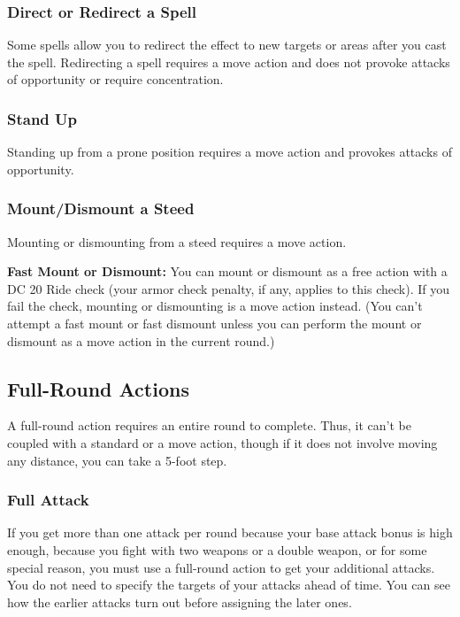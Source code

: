 \subsubsection{Direct or Redirect a Spell}

Some spells allow you to redirect the effect to new targets or areas after 
you cast the spell. Redirecting a spell requires a move action and does not provoke 
attacks of opportunity or require concentration.

\subsubsection{Stand Up}

Standing up from a prone position requires a move action and provokes attacks of 
opportunity.

\subsubsection{Mount/Dismount a Steed}

Mounting or dismounting from a steed requires a move action.

\textbf{Fast Mount or Dismount:} You can mount or dismount as a free action with 
a DC 20 Ride check (your armor check penalty, if any, applies to this check). If 
you fail the check, mounting or dismounting is a move action instead. (You can't 
attempt a fast mount or fast dismount unless you can perform the mount or dismount 
as a move action in the current round.)

\subsection{Full-Round Actions}

A full-round action requires an entire round to complete. Thus, it can't be coupled 
with a standard or a move action, though if it does not involve moving any distance, 
you can take a 5-foot step.

\subsubsection{Full Attack}

If you get more than one attack per round because your base attack bonus is high 
enough, because you fight with two weapons or a double weapon, or for some special 
reason, you must use a full-round action to get your additional attacks. You do 
not need to specify the targets of your attacks ahead of time. You can see how 
the earlier attacks turn out before assigning the later ones.

